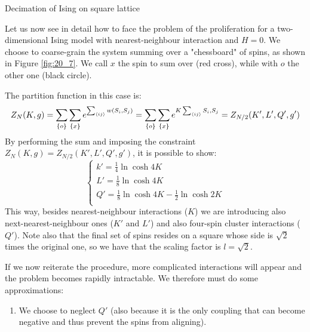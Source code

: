 \documentclass[../main/main.tex]{subfiles}
\begin{document}
\begin{example}{Decimation of Ising on square lattice}{}

  Let us now see in detail how to face the problem of the proliferation for a two-dimensional Ising model with nearest-neighbour interaction and \( H=0 \). We choose to coarse-grain the system summing over a "chessboard" of spins, as shown in Figure \ref{fig:20_7}. We call \( x \) the spin to sum over (red cross), while with \( o \) the other one (black circle).

The partition function in this case is:
\begin{equation*}
  Z_N (K,g) = \sum_{\{ o \}  }^{} \sum_{\{ x \}  }^{}   e^{\sum_{\expval{ij}
  }^{} w (S_i,S_j)  } = \sum_{\{ o \}  }^{} \sum_{\{ x \}  }^{}   e^{K \sum_{\expval{ij}}^{} S_i,S_j }
  =Z_{N/2} (K',L',Q',g')
\end{equation*}
By performing the sum and imposing the constraint \( Z_N  (K,g) = Z_{N/2} (K',L',Q',g') \), it is possible to show:
\begin{equation*}
  \begin{cases}
   k' = \frac{1}{4} \ln{\cosh 4 K} \\
   L' = \frac{1}{8} \ln{\cosh 4 K} \\
   Q' = \frac{1}{8} \ln{\cosh 4 K} - \frac{1}{2} \ln{\cosh 2 K}\\
  \end{cases}
\end{equation*}
This way, besides nearest-neighbour interactions (\( K \)) we are introducing also next-nearest-neighbour ones (\( K' \)  and \( L' \)) and also four-spin cluster interactions (\( Q' \)).
Note also that the final set of spins resides on a square whose side is \( \sqrt{2}  \)  times the original one, so we have that the scaling factor is \( l = \sqrt{2}  \).

If we now reiterate the procedure, more complicated interactions will appear and the problem becomes rapidly intractable. We therefore must do some approximations:

\begin{enumerate}

\item  We choose to neglect \( Q' \) (also because it is the only coupling that can become negative and thus prevent the spins from aligning).


\end{enumerate}
\end{example}
\end{document}
